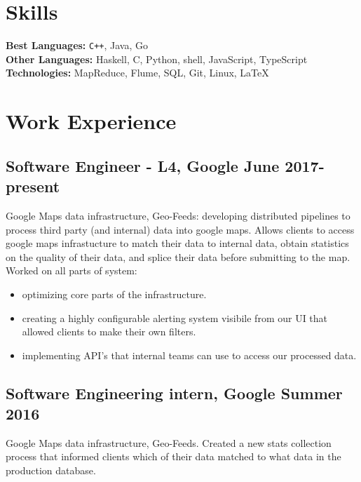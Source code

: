 \documentclass[5pt]{resume}
\begin{document}


{\color{titleColor}\section{Skills}}
\noindent\textbf{Best Languages:} {\color{default} \verb!C++!, Java, Go }\\
\textbf{Other Languages:} {\color{default} Haskell, C, Python, shell, JavaScript, TypeScript} \\
\textbf{Technologies:} {\color{default} MapReduce, Flume, SQL, Git, Linux, \LaTeX } 

{\color{titleColor} \section{Work Experience}}

\subsection{\textbf{Software Engineer - L4, Google \hfill June 2017-present}}
{\color{default} Google Maps data infrastructure, Geo-Feeds: developing 
  distributed pipelines to process third party (and internal) data into google 
  maps. Allows clients to access google maps infrastucture to match their data 
  to internal data, obtain statistics on the quality of their data, and splice
  their data before submitting to the map.
  Worked on all parts of system:
  \begin{itemize}
	\itemsep0em 
  	\item optimizing core parts of the infrastructure.
  	\item creating a highly configurable alerting system visibile from our UI that allowed clients to make their own filters.
	\item implementing API's that internal teams can use to access our processed data.
\end{itemize}
}

\subsection{\textbf{Software Engineering intern, Google \hfill Summer 2016}}
{\color{default} Google Maps data infrastructure, Geo-Feeds. Created a new stats collection process that informed clients which of their data matched to what data in the production database.}
\end{document}
